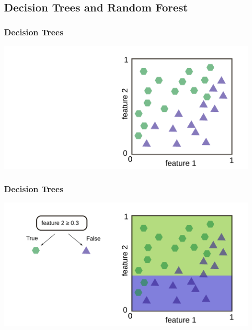\documentclass[aspectratio=169]{beamer}
\begin{document}
\subsection{Decision Trees and Random Forest}

\setcounter{tocdepth}{2}
\begin{frame}{}
   \tableofcontents[currentsubsection]
\end{frame}


\begin{frame}
  \frametitle{Decision Trees}
  \begin{center}
    \includegraphics[width=13.0cm]{images/decision_tree_0.pdf}
  \end{center}  
\end{frame}

\begin{frame}
  \frametitle{Decision Trees}
  \begin{center}
    \includegraphics[width=13.0cm]{images/decision_tree_1.pdf}
  \end{center}  
\end{frame}
\end{document}
